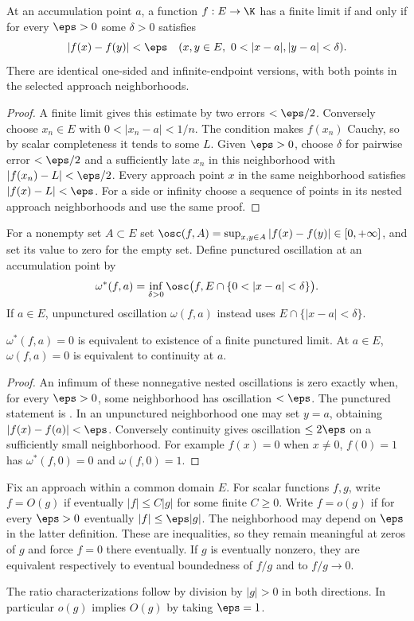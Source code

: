 \begin{theorem}
At an accumulation point $a$, a function $f:E\to\K$ has a finite limit if and only if for every $\eps>0$ some $\delta>0$ satisfies
\[ |f(x)-f(y)|<\eps\quad( x,y\in E,\ 0<|x-a|,|y-a|<\delta). \]
There are identical one-sided and infinite-endpoint versions, with both points in the selected approach neighborhoods.
\end{theorem}
\begin{proof}
A finite limit gives this estimate by two errors $<\eps/2$. Conversely choose $x_n\in E$ with $0<|x_n-a|<1/n$. The condition makes $f(x_n)$ Cauchy, so by scalar completeness it tends to some $L$. Given $\eps>0$, choose $\delta$ for pairwise error $<\eps/2$ and a sufficiently late $x_n$ in this neighborhood with $|f(x_n)-L|<\eps/2$. Every approach point $x$ in the same neighborhood satisfies $|f(x)-L|<\eps$. For a side or infinity choose a sequence of points in its nested approach neighborhoods and use the same proof.
\end{proof}

\begin{definition}
For a nonempty set $A\subset E$ set $\osc(f,A)=\sup_{x,y\in A}|f(x)-f(y)|\in[0,+\infty]$, and set its value to zero for the empty set. Define punctured oscillation at an accumulation point by
\[ \omega^*(f,a)=\inf_{\delta>0}\osc\bigl(f,E\cap\{0<|x-a|<\delta\}\bigr). \]
If $a\in E$, unpunctured oscillation $\omega(f,a)$ instead uses $E\cap\{|x-a|<\delta\}$.
\end{definition}
\begin{proposition}
$\omega^*(f,a)=0$ is equivalent to existence of a finite punctured limit. At $a\in E$, $\omega(f,a)=0$ is equivalent to continuity at $a$.
\end{proposition}
\begin{proof}
An infimum of these nonnegative nested oscillations is zero exactly when, for every $\eps>0$, some neighborhood has oscillation $<\eps$. The punctured statement is . In an unpunctured neighborhood one may set $y=a$, obtaining $|f(x)-f(a)|<\eps$. Conversely continuity gives oscillation $\le2\eps$ on a sufficiently small neighborhood. For example $f(x)=0$ when $x\ne0$, $f(0)=1$ has $\omega^*(f,0)=0$ and $\omega(f,0)=1$.
\end{proof}

\begin{definition}
Fix an approach within a common domain $E$. For scalar functions $f,g$, write $f=O(g)$ if eventually $|f|\le C|g|$ for some finite $C\ge0$. Write $f=o(g)$ if for every $\eps>0$ eventually $|f|\le\eps|g|$. The neighborhood may depend on $\eps$ in the latter definition. These are inequalities, so they remain meaningful at zeros of $g$ and force $f=0$ there eventually. If $g$ is eventually nonzero, they are equivalent respectively to eventual boundedness of $f/g$ and to $f/g\to0$.
\end{definition}
The ratio characterizations follow by division by $|g|>0$ in both directions. In particular $o(g)$ implies $O(g)$ by taking $\eps=1$.

